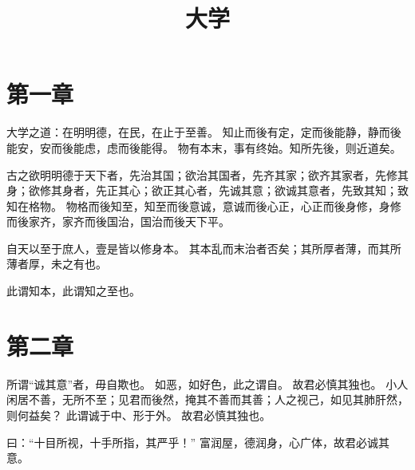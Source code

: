 \documentclass[twoside,openany]{book}
\title{大学}
\author{\xpinyin{曾}{zeng1}\xpinyin{参}{shen1}}
\date{}
\begin{document}
\maketitle
	
\noindent
	
	
\begin{pinyinscope}
\chapter{第一章}\label{ch01}
大学之道：在明明德，在民，在止于至善。
知止而後有定，定而後能静，静而後能安，安而後能虑，虑而後能得。
物有本末，事有终始。知所先後，则近道矣。

古之欲明明德于天下者，先治其国；欲治其国者，先齐其家；欲齐其家者，先修其身；欲修其身者，先正其心；欲正其心者，先诚其意；欲诚其意者，先致其知；致知在格物。
物格而後知至，知至而後意诚，意诚而後心正，心正而後身修，身修而後家齐，家齐而後国治，国治而後天下平。

自天以至于庶人，壹是皆以修身本。
其本乱而末治者否矣；其所厚者薄，而其所薄者厚，未之有也。

此谓知本，此谓知之至也。

\chapter{第二章}\label{ch02}
所谓“诚其意”者，毋自欺也。
如恶，如好色，此之谓自。
故君必慎其独也。
小人闲居不善，无所不至；见君而後然，掩其不善而其善；人之视己，如见其肺肝然，则何益矣？
此谓诚于中、形于外。
故君必慎其独也。

曰：“十目所视，十手所指，其严乎！”
富润屋，德润身，心广体，故君必诚其意。


\end{pinyinscope}
\end{document}
